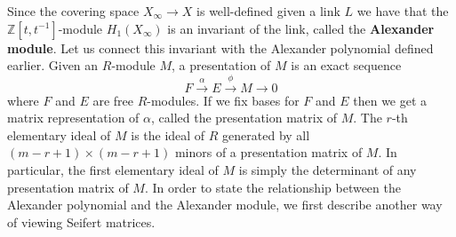 Since the covering space $X_\infty \rightarrow X$ is well-defined given a link $L$ we have that the $\mathbb Z[t,t^{-1}]$-module $H_1(X_\infty)$ is an invariant of the link, called the \textbf{Alexander module}. Let us connect this invariant with the Alexander polynomial defined earlier. Given an $R$-module $M$, a presentation of $M$ is an exact sequence
\[ F \stackrel{\alpha}{\longrightarrow} E \stackrel{\phi}{\longrightarrow} M \rightarrow 0 \]
where $F$ and $E$ are free $R$-modules. If we fix bases for $F$ and $E$ then we get a matrix representation of $\alpha$, called the presentation matrix of $M$. The $r$-th elementary ideal of $M$ is the ideal of $R$ generated by all $(m-r+1) \times (m-r+1)$ minors of a presentation matrix of $M$. In particular, the first elementary ideal of $M$ is simply the determinant of any presentation matrix of $M$. In order to state the relationship between the Alexander polynomial and the Alexander module, we first describe another way of viewing Seifert matrices.

